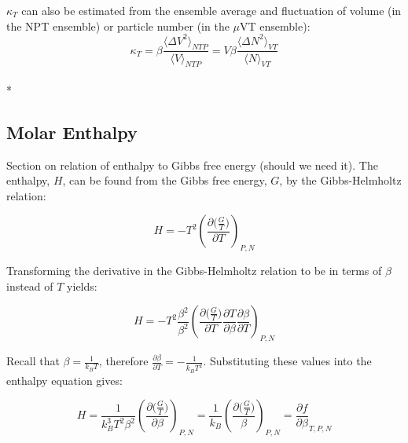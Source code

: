 \documentclass[a4paper,12pt]{article}
\begin{document}
 $\kappa_T$ can also be estimated from the ensemble average and fluctuation of volume (in the NPT ensemble) or particle number (in the $\mu$VT ensemble)\cite{comp}:
\begin{equation}\kappa_T = \beta \frac{\langle \Delta V^2 \rangle_{NTP}}{\langle V \rangle_{NTP}} = V \beta \frac{\langle \Delta N^2 \rangle_{VT}}{\langle N \rangle_{VT}}\end{equation}\\*


\subsection{Molar Enthalpy}
 Section on relation of enthalpy to Gibbs free energy (should we need it).
 The enthalpy, $H$, can be found from the Gibbs free energy, $G$, by the Gibbs-Helmholtz relation: 

\begin{equation}H=-T^2 \left(\frac{\partial \big(\frac{G}{T}\big)}{\partial T}\right)_{P,N}\end{equation}

 Transforming the derivative in the Gibbs-Helmholtz relation to be in terms of $\beta$ instead of $T$ yields:

\begin{equation}H=-T^2  \frac{\beta^2}{\beta^2}\left(\frac{\partial \big(\frac{G}{T}\big)}{\partial T} \frac{\partial T}{\partial \beta} \frac{\partial \beta}{\partial T}\right)_{P,N}\end{equation}


 Recall that $\beta = \frac{1}{k_B T}$, therefore $\frac{\partial \beta}{\partial T} = - \frac{1}{k_B T^2}$. Substituting these values into the enthalpy equation gives:

\begin{equation}H = \frac{1}{k_B^3 T^2 \beta^2} \left(\frac{\partial \big(\frac{G}{T}\big)}{\partial \beta}\right)_{P,N} = \frac{1}{k_B} \left(\frac{\partial \big(\frac{G}{T}\big)}{\beta}\right)_{P,N} = \frac{\partial f}{\partial \beta}_{T, P,N} \end{equation}

\end{document}
